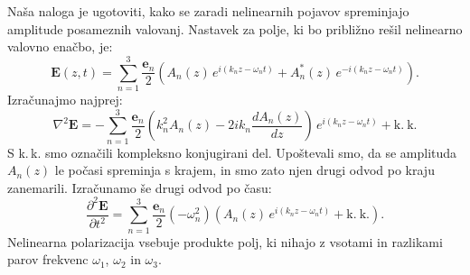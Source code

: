 Naša naloga
je ugotoviti, kako se zaradi nelinearnih pojavov spreminjajo amplitude posameznih valovanj.
Nastavek za polje, ki bo približno rešil nelinearno valovno enačbo, je:
\begin{equation}
\mathbf{E}(z,t) = \sum_{n=1}^3 \frac{\mathbf{e}_{n}}{2}\left(A_{n}(z)\, 
e^{i(k_{n}z-\omega_{n}t)}+A_{n}^{*}(z)\, e^{-i(k_{n}z-\omega_{n}t)}\right)\!\!.
\label{eq:nlnastavek}
\end{equation}
Izračunajmo najprej:
\begin{equation}
\nabla^{2}\mathbf{E}=-\sum_{n=1}^3 \frac{\mathbf{e}_{n}}{2}\left(k_{n}^{2}A_{n}(z)-2ik_{n}
\frac{dA_{n}(z)}{dz}\right)\, e^{i(k_{n}z-\omega_{n}t)}+\mathrm{k.~k.}
\label{8.5}
\end{equation}
S k.\,k. smo označili kompleksno konjugirani del. Upoštevali smo,
da se amplituda $A_{n}(z)$ le počasi spreminja s krajem, in smo zato njen
drugi odvod po kraju zanemarili.
Izračunamo še drugi odvod po času:
\begin{equation}
\frac{\partial^2\mathbf{E}}{\partial t^2}=\sum_{n=1}^3 \frac{\mathbf{e}_{n}}{2}
\left(-\omega_n^2\right) \left(A_{n}(z)\, e^{i(k_{n}z-\omega_{n}t)}+\mathrm{k.~k.}\right)\!\!.
\label{8.5a}
\end{equation}
Nelinearna polarizacija vsebuje produkte polj, ki nihajo z
vsotami in razlikami parov frekvenc $\omega_{1}$, $\omega_{2}$ in
$\omega_{3}$.

